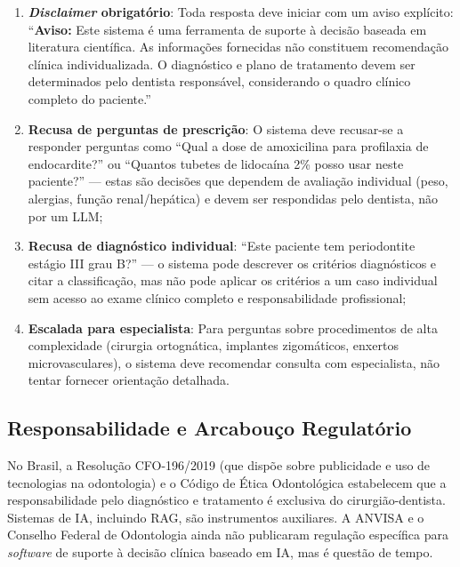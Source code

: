 \begin{enumerate}
    \item \textbf{\textit{Disclaimer} obrigatório}: Toda resposta deve iniciar com um aviso explícito: ``\textbf{Aviso:} Este sistema é uma ferramenta de suporte à decisão baseada em literatura científica. As informações fornecidas não constituem recomendação clínica individualizada. O diagnóstico e plano de tratamento devem ser determinados pelo dentista responsável, considerando o quadro clínico completo do paciente.''

    \item \textbf{Recusa de perguntas de prescrição}: O sistema deve recusar-se a responder perguntas como ``Qual a dose de amoxicilina para profilaxia de endocardite?'' ou ``Quantos tubetes de lidocaína 2\% posso usar neste paciente?'' --- estas são decisões que dependem de avaliação individual (peso, alergias, função renal/hepática) e devem ser respondidas pelo dentista, não por um LLM;

    \item \textbf{Recusa de diagnóstico individual}: ``Este paciente tem periodontite estágio III grau B?'' --- o sistema pode descrever os critérios diagnósticos e citar a classificação, mas não pode aplicar os critérios a um caso individual sem acesso ao exame clínico completo e responsabilidade profissional;

    \item \textbf{Escalada para especialista}: Para perguntas sobre procedimentos de alta complexidade (cirurgia ortognática, implantes zigomáticos, enxertos microvasculares), o sistema deve recomendar consulta com especialista, não tentar fornecer orientação detalhada.
\end{enumerate}

\subsection{Responsabilidade e Arcabouço Regulatório}

No Brasil, a Resolução CFO-196/2019 (que dispõe sobre publicidade e uso de tecnologias na odontologia) e o Código de Ética Odontológica estabelecem que a responsabilidade pelo diagnóstico e tratamento é exclusiva do cirurgião-dentista. Sistemas de IA, incluindo RAG, são instrumentos auxiliares. A ANVISA e o Conselho Federal de Odontologia ainda não publicaram regulação específica para \textit{software} de suporte à decisão clínica baseado em IA, mas é questão de tempo.

